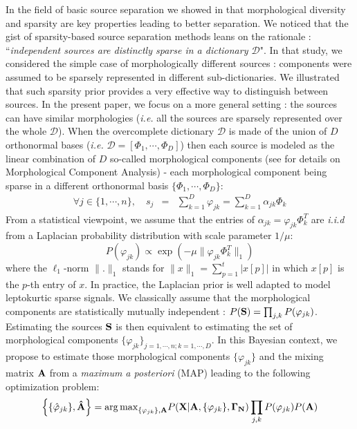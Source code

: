In the field of basic source separation we showed in \cite{MMCA} that morphological diversity and sparsity are key properties 
leading to better separation. We noticed that the gist of sparsity-based source separation methods leans on the rationale : 
``\textit{independent sources are distinctly sparse in a dictionary $\mathcal{D}$}". In that study, we considered the simple 
case of morphologically different sources : components were assumed to be sparsely represented in different sub-dictionaries. 
We illustrated that such sparsity prior provides a very effective way to distinguish between sources. In the present paper, 
we focus on a more general setting : the sources can have similar morphologies (\textit{i.e.} all the sources are sparsely 
represented over the whole $\mathcal{D}$). When the overcomplete dictionary $\mathcal{D}$ is made of the union of $D$ orthonormal 
bases (\textit{i.e.} $\mathcal{D} = \left[\Phi_1,\cdots,\Phi_D\right]$) then each source is modeled as the linear combination 
of $D$ so-called morphological components (see \cite{SED} for details on Morphological Component Analysis) - each morphological 
component being sparse in a different orthonormal basis $\{\Phi_1,\cdots,\Phi_D\}$:
\begin{eqnarray}
\forall  j\in \{1,\cdots,n\}, \quad s_j  & = &  \sum_{k=1}^D \varphi_{jk} = \sum_{k=1}^D \alpha_{jk} \Phi_k
\end{eqnarray}
From a statistical viewpoint, we assume that the entries of $\alpha_{jk} = \varphi_{jk}\Phi_k^T$ are \textit{i.i.d} from 
a Laplacian probability distribution with scale parameter $1/\mu$:
\begin{equation}
\label{eq:source_prior}
P(\varphi_{jk}) \propto \exp\left(- \mu \|\varphi_{jk}\Phi_k^T\|_1\right)
\end{equation}
where the $\ell_1$-norm $\|.\|_1$ stands for $\|x\|_1 = \sum_{p=1}^t |x[p]|$ in which $x[p]$ is the $p$-th entry of $x$. In practice, 
the Laplacian prior is well adapted to model leptokurtic sparse signals. We classically assume that the morphological components are 
statistically mutually independent : $P({\bf S}) = \prod_{j,k} P(\varphi_{jk})$. Estimating the sources ${\bf S}$ is then equivalent 
to estimating the set of morphological components $\{\varphi_{jk}\}_{j=1,\cdots,n;k=1,\cdots,D}$. In this Bayesian context, we propose 
to estimate those morphological components $\{\varphi_{jk}\}$ and the mixing matrix ${\bf A}$ from a \textit{maximum a posteriori} (MAP) 
leading to the following optimization problem:
\begin{equation}
\left\{\{\hat{\varphi}_{jk}\},{\bf \hat{A}}\right\} = {\arg\max}_{\{\varphi_{jk}\},{\bf A}} P({\bf X}|{\bf A},\{\varphi_{jk}\},{\bf \Gamma_N}) \prod_{j,k}P(\varphi_{jk}) P({\bf A})
\end{equation}
